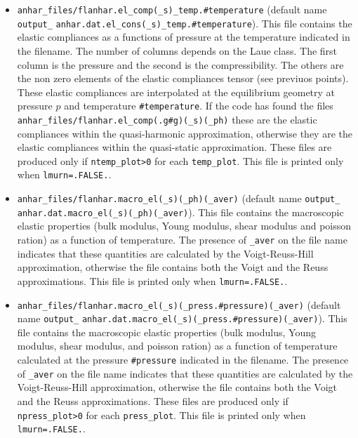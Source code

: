 \documentclass[12pt,a4paper,twoside]{report}
\begin{document}
\begin{itemize}
\item
\texttt{anhar\_files/flanhar.el\_comp(\_s)\_temp.\#temperature}
(default name \texttt{output\_} 
\texttt{anhar.dat.el\_cons(\_s)\_temp.\#temperature}). 
This file contains the elastic compliances as a functions of pressure
at the temperature indicated in the filename. The number
of columns depends on the Laue class. The first column is the 
pressure and the second is the compressibility. The others are the
non zero elements of the elastic compliances tensor (see previuos points). \\ 
These elastic compliances are interpolated at the equilibrium geometry at
pressure $p$ and temperature \texttt{\#temperature}. If the code has found 
the files 
\texttt{anhar\_files/flanhar.el\_comp(.g\#g)(\_s)(\_ph)} these are
the elastic compliances within the quasi-harmonic approximation, otherwise
they are the elastic compliances within the quasi-static approximation.
These files are produced only if \texttt{ntemp\_plot>0} for each
\texttt{temp\_plot}. 
This file is printed only when \texttt{lmurn=.FALSE.}.

\item
\texttt{anhar\_files/flanhar.macro\_el(\_s)(\_ph)(\_aver)}
(default name \texttt{output\_} 
\texttt{anhar.dat.macro\_el(\_s)(\_ph)(\_aver)}). 
This file contains the macroscopic elastic properties (bulk modulus,
Young modulus, shear modulus and poisson ration) as a function of temperature.
The presence of \texttt{\_aver} on the file name indicates that these
quantities are calculated by the Voigt-Reuss-Hill approximation, otherwise
the file contains both the Voigt and the Reuss approximations.
This file is printed only when \texttt{lmurn=.FALSE.}.

\item
\texttt{anhar\_files/flanhar.macro\_el(\_s)(\_press.\#pressure)(\_aver)}
(default name \texttt{output\_} 
\texttt{anhar.dat.macro\_el(\_s)(\_press.\#pressure)(\_aver)}). 
This file contains the macroscopic elastic properties (bulk modulus,
Young modulus, shear modulus, and poisson ration) as a function of 
temperature calculated at the pressure \texttt{\#pressure} indicated
in the filename.
The presence of \texttt{\_aver} on the file name indicates that these
quantities are calculated by the Voigt-Reuss-Hill approximation, otherwise
the file contains both the Voigt and the Reuss approximations.
These files are produced only if \texttt{npress\_plot>0} for each
\texttt{press\_plot}.
This file is printed only when \texttt{lmurn=.FALSE.}.


\end{itemize}
\end{document}
